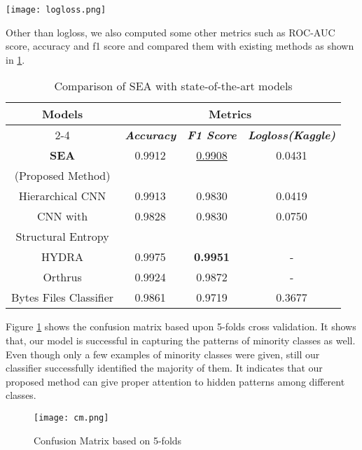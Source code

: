 \documentclass[conference]{IEEEtran}
\begin{document}
{{\begin{figure*}
\centerline{\texttt{[image: logloss.png]}}
\caption{Logloss on 5-fold validation.}
\label{fig9}
\end{figure*}
Other than logloss, we also computed some other metrics such as ROC-AUC score, accuracy and f1 score and compared them with existing methods as shown in \ref{tab1}.

\begin{table}[htbp]
\caption{Comparison of SEA with state-of-the-art models}
\begin{center}
\begin{tabular}{|c|c|c|c|}
\hline
\textbf{Models}&\multicolumn{3}{|c|}{\textbf{Metrics}} \\
\cline{2-4} 
& \textbf{\textit{Accuracy}}& \textbf{\textit{F1 Score}}& \textbf{\textit{Logloss(Kaggle)}} \\

\hline
\textbf{SEA} &0.9912 &\underline{0.9908} &0.0431  \\
(Proposed Method) &  &  & \\
\hline
\hline
Hierarchical CNN \cite{b5}&0.9913 &0.9830 &0.0419  \\
\hline
\hline
CNN with &0.9828 &0.9830 &0.0750  \\
Structural Entropy \cite{b6}& & & \\ 
\hline
\hline
HYDRA \cite{b3}&0.9975 &\textbf{0.9951} &-  \\
\hline
\hline
Orthrus \cite{b4}&0.9924 &0.9872 &-  \\
\hline
\hline
Bytes Files Classifier \cite{b7}&0.9861 &0.9719 &0.3677  \\
\hline
\end{tabular}
\label{tab1}
\end{center}
\end{table}

Figure \ref{fig10} shows the confusion matrix based upon 5-folds cross validation. It shows that, our model is successful in capturing the patterns of minority classes as well. Even though only a few examples of minority classes were given, still our classifier successfully identified the majority of them. It indicates that our proposed method can give proper attention to hidden patterns among different classes.

\begin{figure}[htbp]
\centerline{\texttt{[image: cm.png]}}
\caption{Confusion Matrix based on 5-folds}
\label{fig10}
\end{figure}

}}
\end{document}
